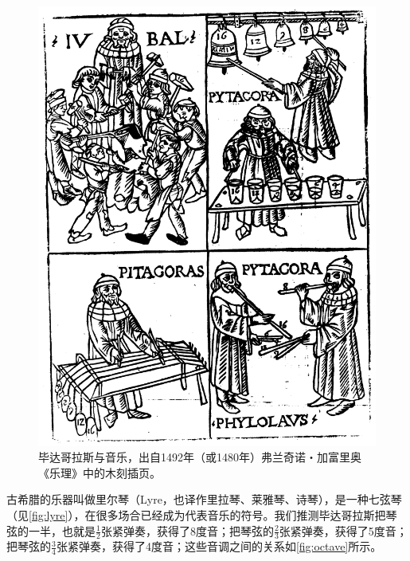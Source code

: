 \documentclass[b5paper]{ctexart}
\begin{document}
\begin{figure}[htbp]
 \centering
 \includegraphics[scale=0.1]{img/pythagoras-music}
 \caption{毕达哥拉斯与音乐，出自1492年（或1480年）弗兰奇诺・加富里奥《乐理》中的木刻插页。}
 \label{fig:pythagoras-music}
\end{figure}

古希腊的乐器叫做里尔琴（Lyre，也译作里拉琴、莱雅琴、诗琴），是一种七弦琴（见\cref{fig:lyre}），在很多场合已经成为代表音乐的符号。我们推测毕达哥拉斯把琴弦的一半，也就是$\frac{1}{2}$张紧弹奏，获得了8度音；把琴弦的$\frac{2}{3}$张紧弹奏，获得了5度音；把琴弦的$\frac{3}{4}$张紧弹奏，获得了4度音；这些音调之间的关系如\cref{fig:octave}所示。
\end{document}
